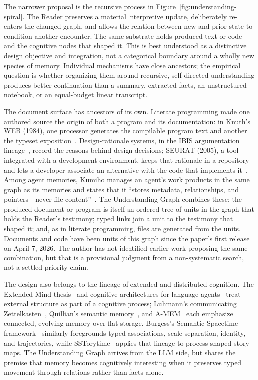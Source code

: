 The narrower proposal is the recursive process in Figure~\ref{fig:understanding-spiral}. The Reader preserves a material interpretive update, deliberately re-enters the changed graph, and allows the relation between new and prior state to condition another encounter. The same substrate holds produced text or code and the cognitive nodes that shaped it. This is best understood as a distinctive design objective and integration, not a categorical boundary around a wholly new species of memory. Individual mechanisms have close ancestors; the empirical question is whether organizing them around recursive, self-directed understanding produces better continuation than a summary, extracted facts, an unstructured notebook, or an equal-budget linear transcript.

The document surface has ancestors of its own. Literate programming made one authored source the origin of both a program and its documentation: in Knuth's WEB (1984), one processor generates the compilable program text and another the typeset exposition~\cite{knuth1984literate}. Design-rationale systems, in the IBIS argumentation lineage~\cite{kunz1970ibis}, record the reasons behind design decisions; SEURAT (2005), a tool integrated with a development environment, keeps that rationale in a repository and lets a developer associate an alternative with the code that implements it~\cite{burge2005seurat}. Among agent memories, Kumiho manages an agent's work products in the same graph as its memories and states that it ``stores metadata, relationships, and pointers---never file content''~\cite{park2026kumiho}. The Understanding Graph combines these: the produced document or program is itself an ordered tree of units in the graph that holds the Reader's testimony; typed links join a unit to the testimony that shaped it; and, as in literate programming, files are generated from the units. Documents and code have been units of this graph since the paper's first release on April 7, 2026. The author has not identified earlier work proposing the same combination, but that is a provisional judgment from a non-systematic search, not a settled priority claim.

The design also belongs to the lineage of extended and distributed cognition. The Extended Mind thesis~\cite{clark1998extended} and cognitive architectures for language agents~\cite{sumers2024cognitive} treat external structure as part of a cognitive process; Luhmann's communicating Zettelkasten~\cite{luhmann1981}, Quillian's semantic memory~\cite{quillian1967}, and A-MEM~\cite{xu2025amem} each emphasize connected, evolving memory over flat storage. Burgess's Semantic Spacetime framework~\cite{burgess2016spacetimes} similarly foregrounds typed associations, scale separation, identity, and trajectories, while SSTorytime~\cite{burgess_sstorytime} applies that lineage to process-shaped story maps. The Understanding Graph arrives from the LLM side, but shares the premise that memory becomes cognitively interesting when it preserves typed movement through relations rather than facts alone.


